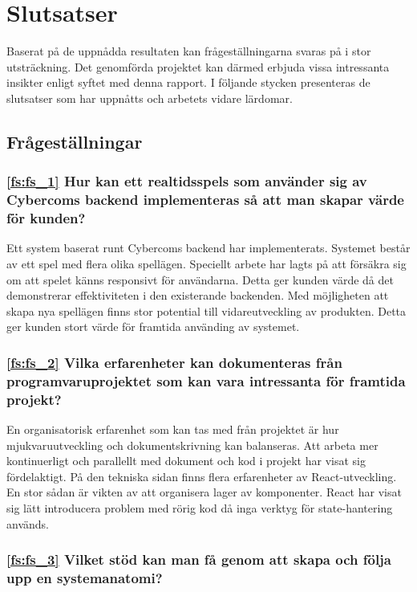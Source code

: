 \chapter{Slutsatser}
\label{cha:slutsatser}

Baserat på de uppnådda resultaten kan frågeställningarna svaras på i stor utsträckning. Det genomförda projektet kan därmed erbjuda vissa intressanta insikter enligt syftet med denna rapport. I följande stycken presenteras de slutsatser som har uppnåtts och arbetets vidare lärdomar.

\section{Frågeställningar}

\subsection*{\ref{fs:fs_1} Hur kan ett realtidsspels som använder sig av Cybercoms backend implementeras så att man skapar värde för kunden?}

Ett system baserat runt Cybercoms backend har implementerats. Systemet består av ett spel med flera olika spellägen. Speciellt arbete har lagts på att försäkra sig om att spelet känns responsivt för användarna. Detta ger kunden värde då det demonstrerar effektiviteten i den existerande backenden.
Med möjligheten att skapa nya spellägen finns stor potential till vidareutveckling av produkten. Detta ger kunden stort värde för framtida använding av systemet.

\subsection*{\ref{fs:fs_2} Vilka erfarenheter kan dokumenteras från programvaruprojektet som kan vara intressanta för framtida projekt?}

En organisatorisk erfarenhet som kan tas med från projektet är hur mjukvaruutveckling och dokumentskrivning kan balanseras. Att arbeta mer kontinuerligt och parallellt med dokument och kod i projekt har visat sig fördelaktigt. På den tekniska sidan finns flera erfarenheter av React-utveckling. En stor sådan är vikten av att organisera lager av komponenter. React har visat sig lätt introducera problem med rörig kod då inga verktyg för state-hantering används.

\subsection*{\ref{fs:fs_3} Vilket stöd kan man få genom att skapa och följa upp en systemanatomi?}


